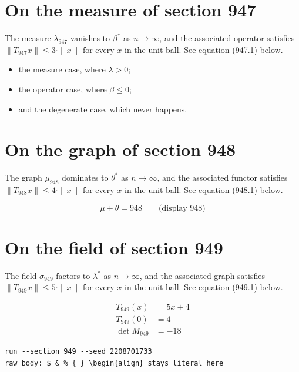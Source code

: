 \documentclass{article}
\begin{document}
\section{On the measure of section 947}
The measure $\lambda_{947}$ vanishes to $\beta^{*}$ as $n \to \infty$,
and the associated operator satisfies $\|T_{947} x\| \leq 3 \cdot \|x\|$
for every $x$ in the unit ball. See equation (947.1) below.

\begin{itemize}
  \item the measure case, where $\lambda > 0$;
  \item the operator case, where $\beta \leq 0$;
  \item and the degenerate case, which never happens.
\end{itemize}

\section{On the graph of section 948}
The graph $\mu_{948}$ dominates to $\theta^{*}$ as $n \to \infty$,
and the associated functor satisfies $\|T_{948} x\| \leq 4 \cdot \|x\|$
for every $x$ in the unit ball. See equation (948.1) below.

$$
\mu + \theta = 948 \qquad \text{(display 948)}
$$

\section{On the field of section 949}
The field $\sigma_{949}$ factors to $\lambda^{*}$ as $n \to \infty$,
and the associated graph satisfies $\|T_{949} x\| \leq 5 \cdot \|x\|$
for every $x$ in the unit ball. See equation (949.1) below.

\begin{align}
T_{949}(x) &= 5 x + 4 \\
T_{949}(0) &= 4 \\
\det M_{949} &= -18
\end{align}

\begin{verbatim}
run --section 949 --seed 2208701733
raw body: $ & % { } \begin{align} stays literal here
\end{verbatim}
\end{document}
